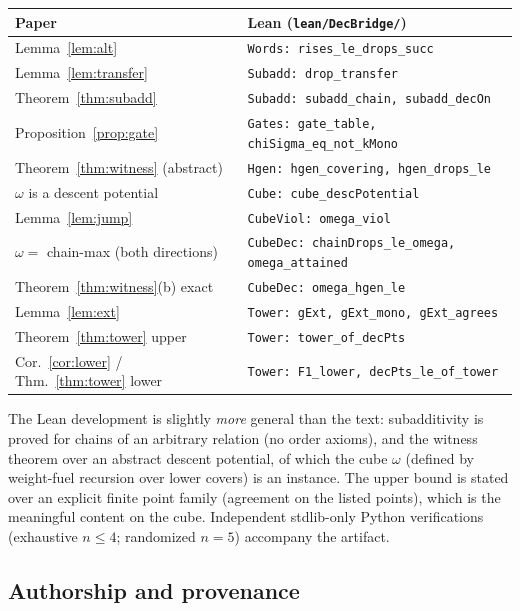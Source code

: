 \documentclass[11pt]{article}
\theoremstyle{remark}
\begin{document}
\begin{center}
\begin{tabular}{ll}
\toprule
Paper & Lean (\texttt{lean/DecBridge/})\\
\midrule
Lemma~\ref{lem:alt} & \texttt{Words: rises\_le\_drops\_succ}\\
Lemma~\ref{lem:transfer} & \texttt{Subadd: drop\_transfer}\\
Theorem~\ref{thm:subadd} & \texttt{Subadd: subadd\_chain, subadd\_decOn}\\
Proposition~\ref{prop:gate} & \texttt{Gates: gate\_table, chiSigma\_eq\_not\_kMono}\\
Theorem~\ref{thm:witness} (abstract) & \texttt{Hgen: hgen\_covering, hgen\_drops\_le}\\
$\omega$ is a descent potential & \texttt{Cube: cube\_descPotential}\\
Lemma~\ref{lem:jump} & \texttt{CubeViol: omega\_viol}\\
$\omega=$ chain-max (both directions) & \texttt{CubeDec: chainDrops\_le\_omega, omega\_attained}\\
Theorem~\ref{thm:witness}(b) exact & \texttt{CubeDec: omega\_hgen\_le}\\
Lemma~\ref{lem:ext} & \texttt{Tower: gExt, gExt\_mono, gExt\_agrees}\\
Theorem~\ref{thm:tower} upper & \texttt{Tower: tower\_of\_decPts}\\
Cor.~\ref{cor:lower} / Thm.~\ref{thm:tower} lower & \texttt{Tower: F1\_lower, decPts\_le\_of\_tower}\\
\bottomrule
\end{tabular}
\end{center}

The Lean development is slightly \emph{more} general than the text:
subadditivity is proved for chains of an arbitrary relation (no order
axioms), and the witness theorem over an abstract descent potential, of
which the cube $\omega$ (defined by weight-fuel recursion over lower covers)
is an instance. The upper bound is stated over an explicit finite point
family (agreement on the listed points), which is the meaningful content on
the cube. Independent stdlib-only Python verifications (exhaustive $n\le 4$;
randomized $n=5$) accompany the artifact.

\subsection*{Authorship and provenance}
\end{document}

